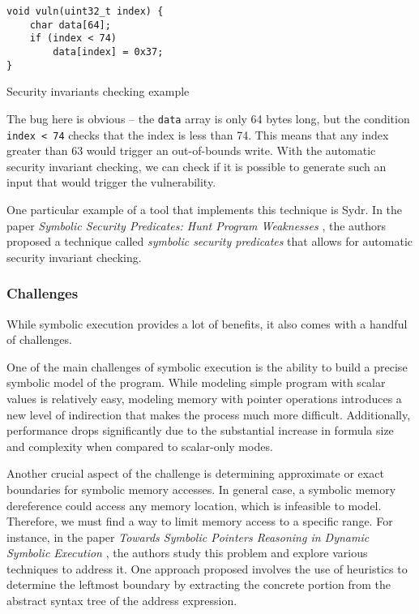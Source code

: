 \begin{listing}[htp]
	\centering
	\begin{minipage}{.4\linewidth}
		\begin{verbatim}
void vuln(uint32_t index) {
	char data[64];
	if (index < 74)
		data[index] = 0x37;
}
		\end{verbatim}
	\end{minipage}
	\caption{Security invariants checking example}
	\label{lst:example6}
\end{listing}

The bug here is obvious -- the \texttt{data} array is only 64 bytes long, but the condition \texttt{index < 74} checks that the index is less than 74. This means that any index greater than 63 would trigger an out-of-bounds write. With the automatic security invariant checking, we can check if it is possible to generate such an input that would trigger the vulnerability.

One particular example of a tool that implements this technique is Sydr. In the paper \textit{Symbolic Security Predicates: Hunt Program Weaknesses} \cite{sydr-symbolic-security-predicates}, the authors proposed a technique called \textit{symbolic security predicates} that allows for automatic security invariant checking.

\subsubsection{Challenges}

While symbolic execution provides a lot of benefits, it also comes with a handful of challenges.


One of the main challenges of symbolic execution is the ability to build a precise symbolic model of the program. While modeling simple program with scalar values is relatively easy, modeling memory with pointer operations introduces a new level of indirection that makes the process much more difficult. Additionally, performance drops significantly due to the substantial increase in formula size and complexity when compared to scalar-only modes.

Another crucial aspect of the challenge is determining approximate or exact boundaries for symbolic memory accesses. In general case, a symbolic memory dereference could access any memory location, which is infeasible to model. Therefore, we must find a way to limit memory access to a specific range. For instance, in the paper \textit{Towards Symbolic Pointers Reasoning in Dynamic Symbolic Execution} \cite{symbolic-pointers-reasoning}, the authors study this problem and explore various techniques to address it. One approach proposed involves the use of heuristics to determine the leftmost boundary by extracting the concrete portion from the abstract syntax tree of the address expression.

